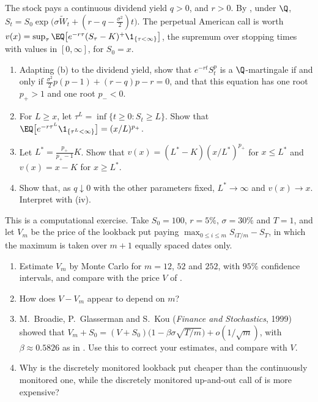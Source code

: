 \begin{exercise}\label{ex:exo-perpetual-call}
\hard The stock pays a continuous dividend yield $q>0$, and $r>0$. By ,
under $\Q$, $S_t=S_0\exp\big(\sigma\widetilde W_t+(r-q-\frac{\sigma^2}2)t\big)$. The perpetual American
call is worth
$v(x)=\sup_{\tau}\EQ\big[e^{-r\tau}(S_\tau-K)^+\1_{\{\tau<\infty\}}\big]$, the supremum over stopping
times with values in $[0,\infty]$, for $S_0=x$.
\begin{enumerate}[label=(\alph*)]
  \item Adapting (b) to the dividend yield, show that $e^{-rt}S_t^p$ is a
    $\Q$-martingale if and only if $\frac{\sigma^2}2p(p-1)+(r-q)p-r=0$, and that this equation has
    one root $p_+>1$ and one root $p_-<0$.
  \item For $L\ge x$, let $\tau^L=\inf\{t\ge0:S_t\ge L\}$. Show that
    $\EQ\big[e^{-r\tau^L}\1_{\{\tau^L<\infty\}}\big]=(x/L)^{p_+}$.
  \item Let $L^*=\frac{p_+}{p_+-1}K$. Show that $v(x)=(L^*-K)(x/L^*)^{p_+}$ for $x\le L^*$ and
    $v(x)=x-K$ for $x\ge L^*$.
  \item Show that, as $q\downarrow0$ with the other parameters fixed, $L^*\to\infty$ and $v(x)\to x$.
    Interpret with (iv).
\end{enumerate}
\end{exercise}

\begin{exercise}\label{ex:exo-lookback-discrete}
\medium This is a computational exercise. Take $S_0=100$, $r=5\%$, $\sigma=30\%$ and $T=1$, and
let $V_m$ be the price of the lookback put paying $\max_{0\le i\le m}S_{iT/m}-S_T$, in which the
maximum is taken over $m+1$ equally spaced dates only.
\begin{enumerate}[label=(\alph*)]
  \item Estimate $V_m$ by Monte Carlo for $m=12$, $52$ and $252$, with $95\%$ confidence intervals,
    and compare with the price $V$ of .
  \item How does $V-V_m$ appear to depend on $m$?
  \item M.~Broadie, P.~Glasserman and S.~Kou (\emph{Finance and Stochastics}, 1999) showed that
    $V_m+S_0=(V+S_0)\big(1-\beta\sigma\sqrt{T/m}\big)+o(1/\sqrt m)$, with $\beta\approx0.5826$ as in
    . Use this to correct your estimates, and compare with $V$.
  \item Why is the discretely monitored lookback put cheaper than the continuously monitored one,
    while the discretely monitored up-and-out call of  is more expensive?
\end{enumerate}
\end{exercise}
